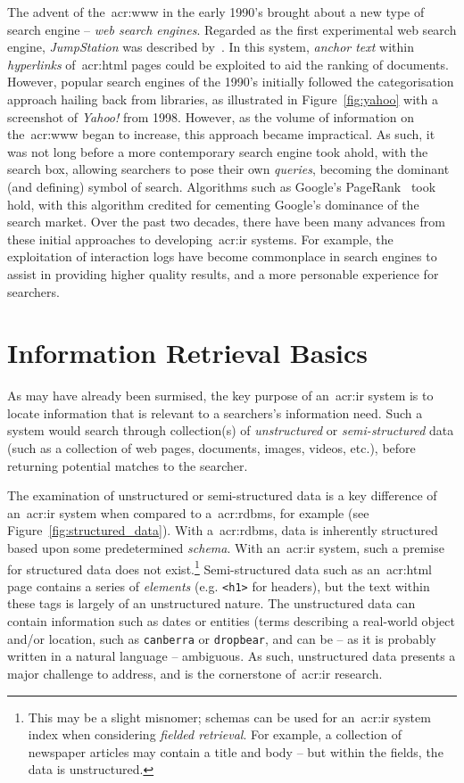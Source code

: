 The advent of the~\gls{acr:www} in the early 1990's brought about a new type of search engine -- \emph{web search engines}. Regarded as the first experimental web search engine, \emph{JumpStation} was described by~\cite{mcbryan1994taming_tools}. In this system, \emph{anchor text} within \emph{hyperlinks} of~\gls{acr:html} pages could be exploited to aid the ranking of documents. However, popular search engines of the 1990's initially followed the categorisation approach hailing back from libraries, as illustrated in Figure~\ref{fig:yahoo} with a screenshot of \emph{Yahoo!} from 1998. However, as the volume of information on the~\gls{acr:www} began to increase, this approach became impractical. As such, it was not long before a more contemporary search engine took ahold, with the search box, allowing searchers to pose their own \emph{queries}, becoming the dominant (and defining) symbol of search. Algorithms such as Google's PageRank~\citep{page1998pagerank} took hold, with this algorithm credited for cementing Google's dominance of the search market. Over the past two decades, there have been many advances from these initial approaches to developing~\gls{acr:ir} systems. For example, the exploitation of interaction logs have become commonplace in search engines to assist in providing higher quality results, and a more personable experience for searchers.

\section{Information Retrieval Basics}\label{sec:ir_background:basics}
As may have already been surmised, the key purpose of an~\gls{acr:ir} system is to locate information that is relevant to a searchers's information need. Such a system would search through collection(s) of \emph{unstructured} or \emph{semi-structured} data (such as a collection of web pages, documents, images, videos, etc.), before returning potential matches to the searcher. 

The examination of unstructured or semi-structured data is a key difference of an~\gls{acr:ir} system when compared to a~\gls{acr:rdbms}, for example (see Figure~\ref{fig:structured_data}). With a~\gls{acr:rdbms}, data is inherently structured based upon some predetermined \emph{schema}. With an~\gls{acr:ir} system, such a premise for structured data does not exist.\footnote{This may be a slight misnomer; schemas can be used for an~\gls{acr:ir} system index when considering \emph{fielded retrieval}. For example, a collection of newspaper articles may contain a title and body -- but within the fields, the data is unstructured.} Semi-structured data such as an~\gls{acr:html} page contains a series of \emph{elements} (e.g. \texttt{<h1>} for headers), but the text within these tags is largely of an unstructured nature. The unstructured data can contain information such as dates or entities (terms describing a real-world object and/or location, such as \texttt{canberra} or \texttt{dropbear}, and can be -- as it is probably written in a natural language -- ambiguous. As such, unstructured data presents a major challenge to address, and is the cornerstone of~\gls{acr:ir} research.

